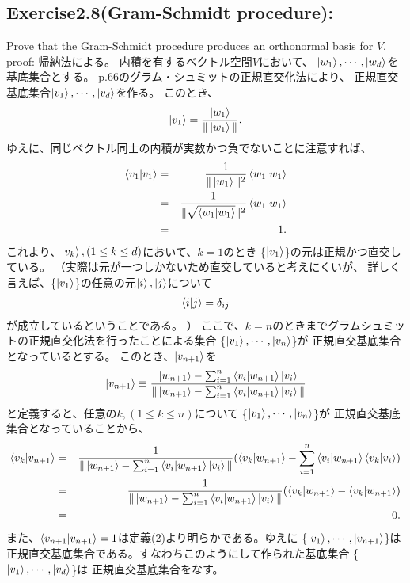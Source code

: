 \setcounter{equation}{0}
\begin{flushleft}
\section{\Large Exercise2.8(Gram-Schmidt procedure):} Prove that the Gram-Schmidt procedure produces an orthonormal basis for $V$.
\newline
{\large proof:}
帰納法による。
内積を有するベクトル空間$V$において、
$\ket{w_1}, \cdots, \ket{w_d}$を基底集合とする。
p.66のグラム・シュミットの正規直交化法により、
正規直交基底集合$\ket{v_1}, \cdots, \ket{v_d}$を作る。
このとき、
\begin{eqnarray}
\ket{v_1} = \frac{\ket{w_1}}{\|\ket{w_1}\|}.
\end{eqnarray}
ゆえに、同じベクトル同士の内積が実数かつ負でないことに注意すれば、
\begin{eqnarray*}
\braket{v_1|v_1} &=& \frac{1}{\|\ket{w_1}\|^2}\braket{w_1|w_1}\\
&=& \frac{1}{\|\sqrt{\braket{w_1|w_1}}\|^2}\braket{w_1|w_1}\\
&=& 1.
\end{eqnarray*}
これより、$\ket{v_k},(1\leq k\leq d)$において、$k = 1$のとき 
\{$\ket{v_1}$\}の元は正規かつ直交している。
\color{blue}
\newline
（実際は元が一つしかないため直交していると考えにくいが、
詳しく言えば、\{$\ket{v_1}$\}の任意の元$\ket{i}, \ket{j}$について
\begin{eqnarray*}
\braket{i|j} = \delta_{ij}
\end{eqnarray*}
が成立しているということである。
）
\color{black}
\newline
ここで、$k = n$のときまでグラムシュミットの正規直交化法を行ったことによる集合
\{$\ket{v_1}, \cdots, \ket{v_{n}}$\}が
正規直交基底集合となっているとする。
このとき、$\ket{v_{n+1}}$を
\begin{eqnarray}
\ket{v_{n+1}} \equiv \frac{\ket{w_{n+1}} - 
\sum_{i=1}^n\braket{v_i|w_{n+1}}\ket{v_i}}
{\|\ket{w_{n+1}} - 
\sum_{i=1}^n\braket{v_i|w_{n+1}}\ket{v_i}\|}
\end{eqnarray}
と定義すると、任意の$k, (1\leq k\leq n)$について
\{$\ket{v_1}, \cdots, \ket{v_{n}}$\}が
正規直交基底集合となっていることから、
\begin{eqnarray*}
\braket{v_k|v_{n+1}} &=& \frac{1}{\|\ket{w_{n+1}} - 
\sum_{i=1}^n\braket{v_i|w_{n+1}}\ket{v_i}\|}
(\braket{v_k|w_{n+1}} - 
\sum_{i=1}^n\braket{v_i|w_{n+1}}\braket{v_k|v_i})\\
&=& \frac{1}{\|\ket{w_{n+1}} - 
\sum_{i=1}^n\braket{v_i|w_{n+1}}\ket{v_i}\|}
(\braket{v_k|w_{n+1}} - \braket{v_k|w_{n+1}})\\
&=& 0.
\end{eqnarray*}
また、$\braket{v_{n+1}|v_{n+1}} = 1$は定義(2)より明らかである。ゆえに
\{$\ket{v_1}, \cdots, \ket{v_{n+1}}$\}は
正規直交基底集合である。すなわちこのようにして作られた基底集合
\{$\ket{v_1}, \cdots, \ket{v_{d}}$\}は
正規直交基底集合をなす。
\end{flushleft}
